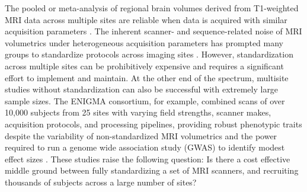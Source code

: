 The pooled  or meta-analysis of regional brain volumes derived from T1-weighted MRI data across multiple sites are reliable when data is acquired with similar acquisition parameters \cite{cannon2014,multicenter01,freesurferReliability}. The inherent scanner- and sequence-related noise of MRI volumetrics under heterogeneous acquisition parameters has prompted many groups to standardize protocols across imaging sites \cite{cannon2014,adniharmonize,ADNIReview}. However, standardization across multiple sites can be prohibitively expensive and requires a significant effort to implement and maintain. %
At the other end of the spectrum, multisite studies without standardization can also be successful with extremely large sample sizes. The ENIGMA consortium, for example, combined scans of over 10,000 subjects from 25 sites with varying field strengths, scanner makes, acquisition protocols, and processing pipelines, providing robust phenotypic traits despite the variability of non-standardized MRI volumetrics and the power required to run a genome wide association study (GWAS) to identify modest effect sizes \cite{thompson2014enigma}. These studies raise the following question: Is there a cost effective middle ground between fully standardizing a set of MRI scanners, and recruiting thousands of subjects across a large number of sites? %